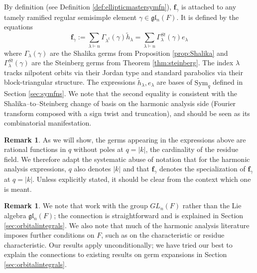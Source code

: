 \documentclass{amsart}
\numberwithin{equation}{section}
\theoremstyle{definition}
\newtheorem{remark}[lemma]{Remark}%
\def\tilde{\widetilde}
\def\Sym{{\mathrm{Sym}}}
\renewcommand{\th}{\tilde{h}}
\newcommand{\fgamma}{\mathbf{f}_{\gamma}}
\newcommand{\fl}{\mathfrak{l}}
\newcommand{\fg}{\mathfrak{g}}
\newcommand{\F}{{\mathbb F}}
\begin{document}
By definition (see Definition \ref{def:ellipticmastersymfn}), $\fgamma$ is attached to any tamely ramified regular semisimple element $\gamma\in \fg\fl_n(F)$. It is defined by the equations
\begin{equation}
\fgamma:=\sum_{\lambda\vdash n} \Gamma_{\lambda^t}(\gamma)\th_\lambda=\sum_{\lambda\vdash n}\Gamma_\lambda^{St}(\gamma)e_\lambda
\end{equation}
where $\Gamma_\lambda(\gamma)$ are the Shalika germs from Proposition \ref{prop:Shalika} and $\Gamma_\lambda^{St}(\gamma)$ are the Steinberg germs from Theorem \ref{thm:steinberg}. The index $\lambda$ tracks nilpotent orbits via their Jordan type and standard parabolics via their block-triangular structure. The expressions $\th_\lambda, e_\lambda$ are bases of $\Sym_q$ defined in Section \ref{sec:symfns}. We note that the second equality is consistent with the Shalika--to--Steinberg change of basis on the harmonic analysis side (Fourier transform composed with a sign twist and truncation), and should be seen as its combinatorial manifestation. %

\begin{remark}
As we will show, the germs appearing in the expressions above are rational functions in $q$ without poles at $q=|k|$, the cardinality of the residue field. We therefore adapt the systematic abuse of notation that for the harmonic analysis expressions, $q$ also denotes $|k|$ and that $\fgamma$ denotes the specialization of $\fgamma$ at $q=|k|$. Unless explicitly stated, it should be clear from the context which one is meant.
\end{remark}


\begin{remark}
We note that \cite{W1,W2} work with the group $GL_n(F)$ rather than the Lie algebra $\fg\fl_n(F)$; the connection is straightforward and is explained in Section \ref{sec:orbitalintegrals}. 
We also note that much of the harmonic analysis literature imposes further conditions on $F$, such as on the characteristic or residue characteristic. Our results apply unconditionally; we have tried our best to explain the connections to existing results on germ expansions in Section \ref{sec:orbitalintegrals}.
\end{remark}
\end{document}
